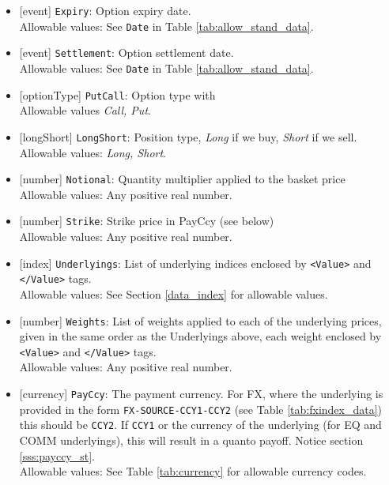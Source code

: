 \begin{itemize}
    \item{}[event] \lstinline!Expiry!: Option expiry date. \\
    Allowable values: See \lstinline!Date! in Table \ref{tab:allow_stand_data}.
    \item{}[event] \lstinline!Settlement!: Option settlement date. \\
    Allowable values: See \lstinline!Date! in Table \ref{tab:allow_stand_data}.
    \item{}[optionType] \lstinline!PutCall!: Option type with \\
          Allowable values \emph{Call, Put}.
    \item{}[longShort] \lstinline!LongShort!: Position type,
          {\em Long} if we buy, {\em Short} if we sell.\\
    Allowable values: \emph{Long, Short}.
        \item{}[number] \lstinline!Notional!: Quantity multiplier applied to the
          basket price \\
          Allowable values: Any positive real number.
        \item{}[number] \lstinline!Strike!: Strike price in PayCcy (see
          below) \\
          Allowable values: Any positive real number.
    \item{}[index] \lstinline!Underlyings!: List of underlying indices
          enclosed by {\tt <Value>} and {\tt </Value>} tags. \\
          Allowable values: See Section \ref{data_index} for allowable values.
    \item{}[number] \lstinline!Weights!: List of weights applied to each of
          the underlying prices, given in the same order as
          the Underlyings above, each weight enclosed by {\tt <Value>} and {\tt </Value>} tags.\\
          Allowable values: Any positive real number.
    \item{}[currency] \lstinline!PayCcy!: The payment currency. For FX, where the underlying is provided
      in the form \lstinline!FX-SOURCE-CCY1-CCY2! (see Table \ref{tab:fxindex_data}) this should
      be \lstinline!CCY2!. If \lstinline!CCY1! or the currency of the underlying (for EQ and
      COMM underlyings), this will result in a quanto payoff. Notice section \ref{sss:payccy_st}. \\
        Allowable values: See Table \ref{tab:currency} for allowable currency codes.
\end{itemize}

